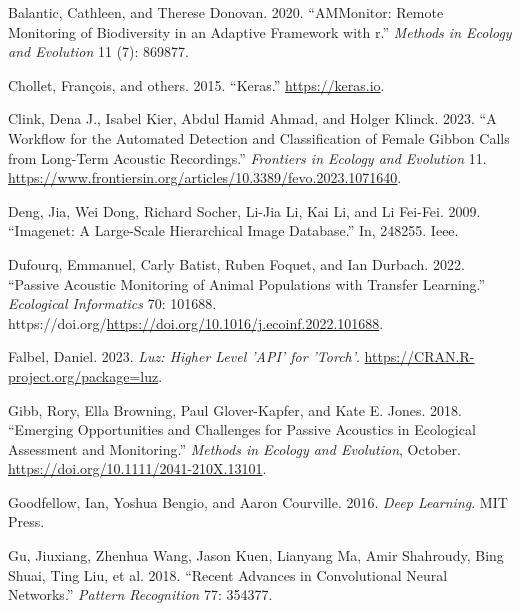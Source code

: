 \documentclass{article}
\newlength{\cslhangindent}
\newlength{\cslentryspacingunit} %
\newenvironment{CSLReferences}[2] %
 {%
  \setlength{\parindent}{0pt}
  \ifodd #1
  \let\oldpar\par
  \def\par{\hangindent=\cslhangindent\oldpar}
  \fi
  \setlength{\parskip}{#2\cslentryspacingunit}
 }%
 {}
\begin{document}
\hypertarget{refs}{}
\begin{CSLReferences}{1}{0}
\leavevmode{}%
Balantic, Cathleen, and Therese Donovan. 2020. {``AMMonitor: Remote
Monitoring of Biodiversity in an Adaptive Framework with r.''}
\emph{Methods in Ecology and Evolution} 11 (7): 869877.

\leavevmode{}%
Chollet, François, and others. 2015. {``Keras.''}
\url{https://keras.io}.

\leavevmode{}%
Clink, Dena J., Isabel Kier, Abdul Hamid Ahmad, and Holger Klinck. 2023.
{``A Workflow for the Automated Detection and Classification of Female
Gibbon Calls from Long-Term Acoustic Recordings.''} \emph{Frontiers in
Ecology and Evolution} 11.
\url{https://www.frontiersin.org/articles/10.3389/fevo.2023.1071640}.

\leavevmode{}%
Deng, Jia, Wei Dong, Richard Socher, Li-Jia Li, Kai Li, and Li Fei-Fei.
2009. {``Imagenet: A Large-Scale Hierarchical Image Database.''} In,
248255. Ieee.

\leavevmode{}%
Dufourq, Emmanuel, Carly Batist, Ruben Foquet, and Ian Durbach. 2022.
{``Passive Acoustic Monitoring of Animal Populations with Transfer
Learning.''} \emph{Ecological Informatics} 70: 101688.
https://doi.org/\url{https://doi.org/10.1016/j.ecoinf.2022.101688}.

\leavevmode{}%
Falbel, Daniel. 2023. \emph{Luz: Higher Level 'API' for 'Torch'}.
\url{https://CRAN.R-project.org/package=luz}.

\leavevmode{}%
Gibb, Rory, Ella Browning, Paul Glover-Kapfer, and Kate E. Jones. 2018.
{``Emerging Opportunities and Challenges for Passive Acoustics in
Ecological Assessment and Monitoring.''} \emph{Methods in Ecology and
Evolution}, October. \url{https://doi.org/10.1111/2041-210X.13101}.

\leavevmode{}%
Goodfellow, Ian, Yoshua Bengio, and Aaron Courville. 2016. \emph{Deep
Learning}. MIT Press.

\leavevmode{}%
Gu, Jiuxiang, Zhenhua Wang, Jason Kuen, Lianyang Ma, Amir Shahroudy,
Bing Shuai, Ting Liu, et al. 2018. {``Recent Advances in Convolutional
Neural Networks.''} \emph{Pattern Recognition} 77: 354377.


\end{CSLReferences}
\end{document}
